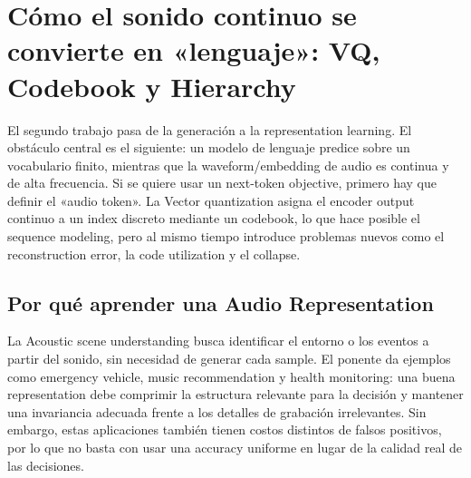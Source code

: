 \section{Cómo el sonido continuo se convierte en «lenguaje»: VQ, Codebook y Hierarchy}

El segundo trabajo pasa de la generación a la representation learning. El obstáculo central es el siguiente: un modelo de lenguaje predice sobre un vocabulario finito, mientras que la waveform/embedding de audio es continua y de alta frecuencia. Si se quiere usar un next-token objective, primero hay que definir el «audio token». La Vector quantization asigna el encoder output continuo a un index discreto mediante un codebook, lo que hace posible el sequence modeling, pero al mismo tiempo introduce problemas nuevos como el reconstruction error, la code utilization y el collapse.


\subsection{Por qué aprender una Audio Representation}

La Acoustic scene understanding busca identificar el entorno o los eventos a partir del sonido, sin necesidad de generar cada sample. El ponente da ejemplos como emergency vehicle, music recommendation y health monitoring: una buena representation debe comprimir la estructura relevante para la decisión y mantener una invariancia adecuada frente a los detalles de grabación irrelevantes. Sin embargo, estas aplicaciones también tienen costos distintos de falsos positivos, por lo que no basta con usar una accuracy uniforme en lugar de la calidad real de las decisiones.




